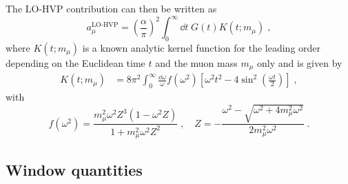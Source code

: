 The LO-HVP contribution can then be written as~\cite{Bernecker:2011}
\begin{equation} \label{eq:a:mu:lohvp}
a_{\mu}^{\text{LO-HVP}} = 
\left( \frac{\alpha}{\pi} \right)^{2}
\int_{0}^{\infty} \dd t \; G(t) K(t; m_{\mu}) \;,
\end{equation}
where $K(t; m_{\mu})$ is a known analytic kernel function for the leading order depending on the Euclidean time $t$ and the muon mass $m_{\mu}$ only and is given by~\cite{Blum:2004cq}
\begin{align}
K(t; m_{\mu}) &= 
8 \pi^{2} \int_{0}^{\infty} \frac{\dd \omega}{\omega} f(\omega^{2}) \left[
\omega^{2} t^{2} - 4 \sin^{2}\left(\frac{\omega t}{2}\right)
\right] \;,
\end{align}
with
\begin{equation}
f(\omega^{2}) = 
\frac{m_{\mu}^{2} \omega^{2} Z^{3} (1 - \omega^{2} Z)}{1 + m_{\mu}^{2} \omega^{2} Z^{2}} \;,
\quad
Z =
- \frac{\omega^{2} - \sqrt{ \omega^{2} + 4 m_{\mu}^{2} \omega^{2} }}{ 2 m_{\mu}^{2} \omega^{2} } \;.
\end{equation}

\subsection{Window quantities}

\label{sec:intro:gm2:windows}

